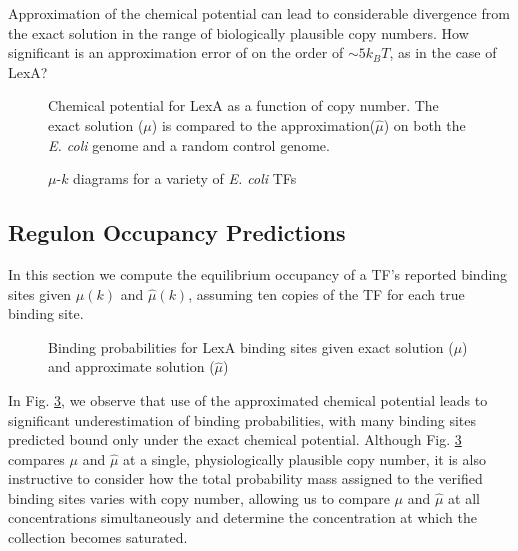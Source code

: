 \documentclass{article}
\newif\ifatlab
\begin{document}
Approximation of the chemical potential can lead to considerable
divergence from the exact solution in the range of biologically
plausible copy numbers.  How significant is an approximation error of
on the order of $\sim 5k_BT$, as in the case of LexA?


\begin{figure}[ht]
  \centering
\ifatlab
\texttt{[image: ../../results/fig/mu\_k\_figs/LexA\_mu\_k\_fig.png]}
\fi
  \caption{Chemical potential for LexA as a function of copy number.
    The exact solution ($\mu$) is compared to the approximation($\hat\mu$) on both the
    \textit{E. coli} genome and a random control genome.}
  \label{fig:LexA_mu_vs_k}
\end{figure}



\begin{figure}[ht]
  \centering
  \ifatlab{}
  \subfigure{\texttt{[image: ../../results/fig/mu\_k\_figs/Crp\_mu\_k\_fig.png]}}
  \subfigure{\texttt{[image: ../../results/fig/mu\_k\_figs/FliA\_mu\_k\_fig.png]}}
\subfigure{\texttt{[image: ../../results/fig/mu\_k\_figs/Fur\_mu\_k\_fig.png]}}
\subfigure{\texttt{[image: ../../results/fig/mu\_k\_figs/OxyR\_mu\_k\_fig.png]}}
\fi
  \caption{$\mu$-$k$ diagrams for a variety of \textit{E. coli} TFs}
  \label{fig:mu_vs_k_examples}
\end{figure}

\subsection{Regulon Occupancy Predictions}
In this section we compute the equilibrium occupancy of a TF's
reported binding sites given $\mu(k)$ and $\hat\mu(k)$, assuming ten
copies of the TF for each true binding site.

  \begin{figure}[ht]
    \centering
    \ifatlab
\texttt{[image: ../../results/fig/mu\_mu\_hat\_figs/LexA\_mu\_mu\_hat\_fig.png]}
\fi
    \caption{Binding probabilities for LexA binding sites given exact solution ($\mu$) and approximate solution ($\hat\mu$)}
    \label{fig:LexA_site_killing_exp}
  \end{figure}

  In Fig. \ref{fig:LexA_site_killing_exp}, we observe that use of the
  approximated chemical potential leads to significant underestimation
  of binding probabilities, with many binding sites predicted bound
  only under the exact chemical potential.  Although
  Fig. \ref{fig:LexA_site_killing_exp} compares $\mu$ and $\hat\mu$ at
  a single, physiologically plausible copy number, it is also
  instructive to consider how the total probability mass assigned to
  the verified binding sites varies with copy number, allowing us to
  compare $\mu$ and $\hat\mu$ at all concentrations simultaneously and
  determine the concentration at which the collection becomes saturated.
\end{document}
